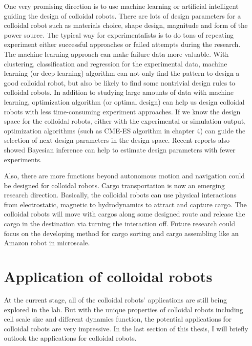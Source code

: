 One very promising  direction is to use machine learning or artificial intelligent guiding the design of colloidal robots. There are lots of design parameters for a colloidal robot such as materials choice, shape design, magnitude and form of the power source. The typical way for experimentalists is to do tons of repeating experiment either successful approaches or failed attempts during the research. The machine learning approach can make failure data more valuable. With clustering, classification and regression for the experimental data, machine learning (or deep learning) algorithm can not only find the pattern to design a good colloidal robot, but also be likely to find some nontrivial design rules to colloidal robots. In addition to studying large amounts of data with machine learning, optimization algorithm (or optimal design) can help us design colloidal robots with less time-consuming experiment approaches. If we know the design space for the colloidal robots, either with the experimental or simulation output, optimization algorithms (such as CME-ES algorithm in chapter 4) can guide the selection of next design parameters in the design space. Recent reports also showed Bayesian inference can help to estimate design parameters with fewer experiments. \autocite{winslow2019characterization}



Also, there are more functions beyond autonomous motion and navigation could be designed for colloidal robots. Cargo transportation is now an emerging research direction.\autocite{demirors2018active,Martinez-Pedrero2015} Basically, the colloidal robots can use physical interactions from electrostatic, magnetic to hydrodynamics to attract and capture cargo. The colloidal robots will move with cargos along some designed route and release the cargo in the destination via turning the interaction off. Future research could focus  on the developing method for cargo sorting and cargo assembling like an Amazon robot in microscale.


\section{Application of colloidal robots}
At the current stage, all of the colloidal robots' applications are still being explored in the lab. But with the unique properties of colloidal robots including cell scale size and different dynamics function, the potential applications for colloidal robots are very impressive. In the last section of this thesis, I will briefly outlook the applications for colloidal robots.

